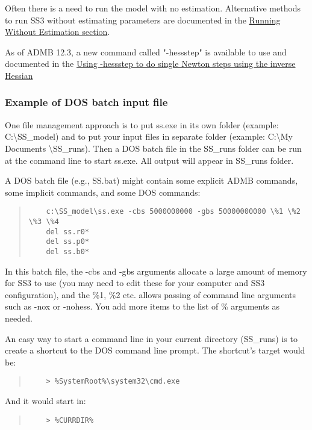 Often there is a need to run the model with no estimation. Alternative methods to run SS3 without estimating parameters are documented in the \hyperlink{NoEst}{Running Without Estimation section}. 

As of ADMB 12.3, a new command called "-hess{\textunderscore}step" is available to use and documented in the \hyperlink{hess-step}{Using -hess{\textunderscore}step to do single Newton steps using the inverse Hessian}

\subsubsection{Example of DOS batch input file}
One file management approach is to put ss.exe in its own folder (example:  C:\textbackslash SS\_model) and to put your input files in separate folder (example:  C:\textbackslash My Documents \textbackslash SS\_runs).  Then a DOS batch file in the SS\_runs folder can be run at the command line to start ss.exe.  All output will appear in SS\_runs folder.

A DOS batch file (e.g., SS.bat) might contain some explicit ADMB commands, some implicit commands, and some DOS commands:

\begin{quote}
	\begin{verbatim}
	c:\SS_model\ss.exe -cbs 5000000000 -gbs 50000000000 \%1 \%2 \%3 \%4 
	del ss.r0*
	del ss.p0*
	del ss.b0*
	\end{verbatim}
\end{quote}


In this batch file, the -cbs and -gbs arguments allocate a large amount of memory for SS3 to use (you may need to edit these for your computer and SS3 configuration), and the \%1, \%2 etc. allows passing of command line arguments such as -nox or -nohess.  You add more items to the list of \% arguments as needed.

An easy way to start a command line in your current directory (SS\_runs) is to create a shortcut to the DOS command line prompt.  The shortcut's target would be:

\begin{quote}
	\begin{verbatim}
	> %SystemRoot%\system32\cmd.exe
	\end{verbatim}
\end{quote}


\noindent And it would start in:
\begin{quote}
	\begin{verbatim}
	> %CURRDIR%
	\end{verbatim}
\end{quote}

